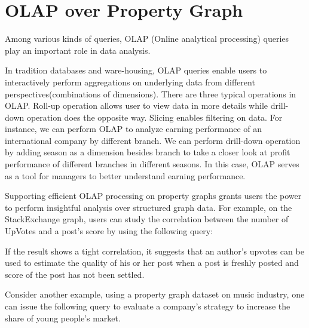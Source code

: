 \section{OLAP over Property Graph}
Among various kinds of queries, OLAP (Online analytical processing) queries play an important role in data analysis. 

In tradition databases and ware-housing, OLAP queries enable users to interactively perform aggregations on underlying data from different perspectives(combinations  of dimensions). There are three typical operations in OLAP. Roll-up operation allows user to view data in more details while drill-down operation does the opposite way. Slicing enables filtering on data. For instance, we can perform OLAP to analyze earning performance of an international company by different branch. We can perform drill-down operation by adding season as a dimension besides branch to take a closer look at profit performance of different branches in different seasons. In this case, OLAP serves as a tool for managers to better understand earning performance. 

Supporting efficient OLAP processing on property graphs grants users the power to perform insightful analysis over structured graph data. For example, on the StackExchange graph, users can study the correlation between the number of UpVotes and a post's score by using the following query:


 If the result shows a tight correlation, it suggests that an author’s upvotes can be used to estimate the quality of his or her post when a post is freshly posted and score of the post has not been settled.


Consider another example, using a property graph dataset on music industry,  one can issue the following query to evaluate a company's strategy to increase the share of young people's market.



